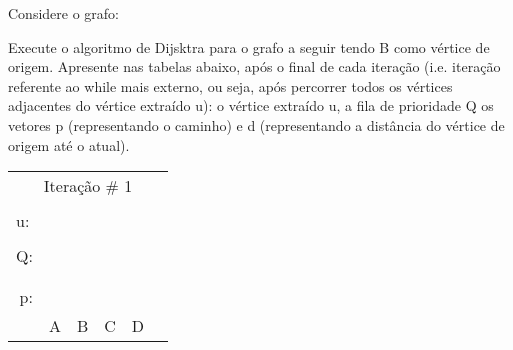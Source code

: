 \documentclass[16pt]{examdesign}
\begin{document}
\begin{fillin}[title={},
                    rearrange=no,resetcounter=no,suppressprefix]
\begin{question}
  \pagebreak
  \end{question}          
          \begin{question}
		[6 pontos] Considere o grafo: 
\begin{center}
\end{center}

Execute o algoritmo de Dijsktra para o grafo a seguir tendo B como vértice de origem. 
Apresente nas tabelas abaixo, após o final de cada iteração  (i.e. iteração referente ao while mais externo, ou seja, após percorrer todos os vértices adjacentes do vértice extraído u): o vértice extraído u, 
a fila de prioridade Q  os vetores p (representando o caminho) e d (representando a distância do vértice de origem até o atual). 
\begin{multicols}{4}
  \begin{tabular}{|llllll|}
  \hline
  \multicolumn{6}{|c|}{Iteração \# 1}                                                                                                          \\
					    &                       &                       &                       &                       &  \\
  u:                                        &                       &                       &                       &                       &  \\ \cline{2-3}
					    &                       &                       &                       &                       &  \\ \cline{2-5}
  \multicolumn{1}{|r|}{Q:}                  & \multicolumn{1}{l|}{} & \multicolumn{1}{l|}{} & \multicolumn{1}{l|}{} & \multicolumn{1}{l|}{} &  \\
  \multicolumn{1}{|l|}{}                    & \multicolumn{1}{l|}{} & \multicolumn{1}{l|}{} & \multicolumn{1}{l|}{} & \multicolumn{1}{l|}{} &  \\ \cline{2-5}
					    &                       &                       &                       &                       &  \\ \cline{2-5}
  \multicolumn{1}{|r|}{\multirow{2}{*}{p:}} & \multicolumn{1}{l|}{} & \multicolumn{1}{l|}{} & \multicolumn{1}{l|}{} & \multicolumn{1}{l|}{} &  \\
  \multicolumn{1}{|r|}{}                    & \multicolumn{1}{l|}{} & \multicolumn{1}{l|}{} & \multicolumn{1}{l|}{} & \multicolumn{1}{l|}{} &  \\ \cline{2-5}
					    & A                     & B                     & C                     & D                     &  \\

\end{tabular}
\end{multicols}
\end{question}
\end{fillin}
\end{document}
